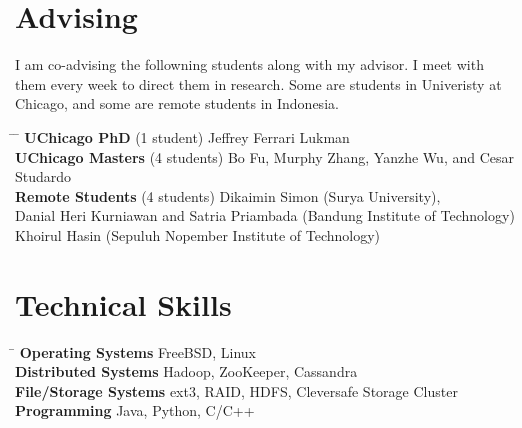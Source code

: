 \documentclass[10pt]{article} %
\begin{document}

\section{Advising}

I am co-advising the followning students along with my advisor. I meet with them
every week to direct them in research. Some are students in Univeristy at
Chicago, and some are remote students in Indonesia.
\begin{tabbing}
\hspace{3.5cm} \= \hspace{2.5cm} \= \kill
\textbf{UChicago PhD} \> (1 student) \> Jeffrey Ferrari Lukman\\
\textbf{UChicago Masters} \> (4 students) \> Bo Fu, Murphy Zhang, Yanzhe Wu, and Cesar Studardo\\
\textbf{Remote Students} \> (4 students) \> Dikaimin Simon (Surya University),\\
\> \>Danial Heri Kurniawan and Satria Priambada (Bandung Institute of Technology)\\
\> \>Khoirul Hasin (Sepuluh Nopember Institute of Technology)
\end{tabbing}



\section{Technical Skills}

\begin{tabbing}
\hspace{4cm} \= \kill
\textbf{Operating Systems} \> FreeBSD, Linux \\
\textbf{Distributed Systems} \> Hadoop, ZooKeeper, Cassandra \\
\textbf{File/Storage Systems} \> ext3, RAID, HDFS, Cleversafe Storage Cluster\\
\textbf{Programming} \> Java, Python, C/C++
\end{tabbing}
\end{document}
